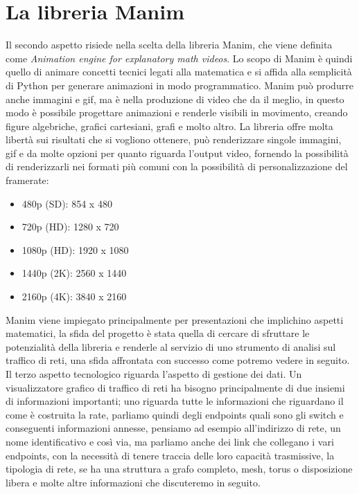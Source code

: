 \documentclass[binding=0.6cm]{sapthesis}
\begin{document}
\section{La libreria Manim}
Il secondo aspetto risiede nella scelta della libreria Manim\cite{Manim}, che viene definita come \textit{Animation engine for explanatory math videos}. Lo scopo di Manim è quindi
quello di animare concetti tecnici legati alla matematica e si affida alla semplicità di Python per generare animazioni in modo programmatico. Manim può produrre anche immagini e gif, ma è nella produzione di video che da il meglio, in questo modo
è possibile progettare animazioni e renderle visibili in movimento, creando figure algebriche, grafici cartesiani, grafi e molto altro\cite{Manim}. 
La libreria offre molta libertà sui risultati che si vogliono ottenere, può renderizzare singole immagini, gif e da molte opzioni per quanto riguarda l'output video, fornendo la possibilità
di renderizzarli nei formati più comuni con la possibilità di personalizzazione del framerate:
\begin{itemize}	
    \item 480p (SD): 854 x 480
    \item 720p (HD): 1280 x 720
    \item 1080p (HD): 1920 x 1080
    \item 1440p (2K): 2560 x 1440
    \item 2160p (4K): 3840 x 2160
\end{itemize}
Manim viene impiegato principalmente per presentazioni che implichino aspetti matematici, la sfida del progetto è stata quella di 
cercare di sfruttare le potenzialità della libreria e renderle al servizio di uno strumento di analisi sul traffico di reti, una sfida affrontata con successo come potremo vedere in seguito.
Il terzo aspetto tecnologico riguarda l'aspetto di gestione dei dati. Un visualizzatore grafico di traffico di reti ha bisogno principalmente di due insiemi di informazioni importanti; uno riguarda tutte le informazioni
che riguardano il come è costruita la rate, parliamo quindi degli endpoints quali sono gli switch e conseguenti informazioni annesse, pensiamo ad esempio all'indirizzo di rete, un nome identificativo e così via, ma parliamo anche dei link che collegano
i vari endpoints, con la necessità di tenere traccia delle loro capacità trasmissive, la tipologia di rete, se ha una struttura a grafo completo, mesh, torus o disposizione libera e molte altre informazioni che discuteremo in seguito.
\end{document}
